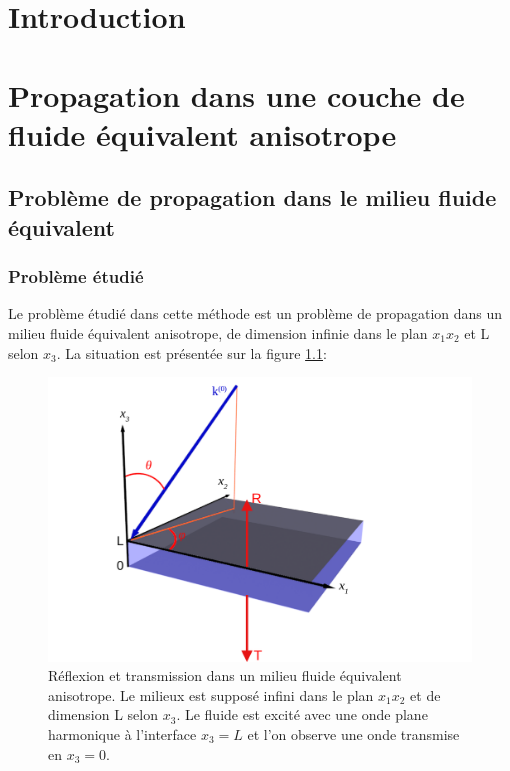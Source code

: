 \documentclass[12pt]{report}
\begin{document}
\newpage
\chapter*{Introduction}

 \setcounter{page}{1}
   
\chapter{Propagation dans une couche de fluide équivalent anisotrope}
\label{Ch_Prop}
\section{Problème de propagation dans le milieu fluide équivalent}
\label{Ch_Prop_S_Pb}
\subsection{Problème étudié}
\label{Ch_Prop_S_Pb_SS_Pb}
    Le problème étudié dans cette méthode est un problème de propagation dans un milieu fluide équivalent anisotrope, de dimension infinie dans le plan $x_1x_2$ et L selon $x_3$.  La situation est présentée sur la figure \ref{Schema}:
    \begin{figure}[ht!]
    \centering
    \includegraphics[scale=1]{Fig3D.pdf}
    \caption{Réflexion et transmission dans un milieu fluide équivalent anisotrope. Le milieux est supposé infini dans le plan $x_1x_2$ et de dimension L selon $x_3$. Le fluide est excité avec une onde plane harmonique à l'interface $x_3=L$ et l'on observe une onde transmise en $x_3=0$. }
    \label{Schema}
    \end{figure}
    
\end{document}
